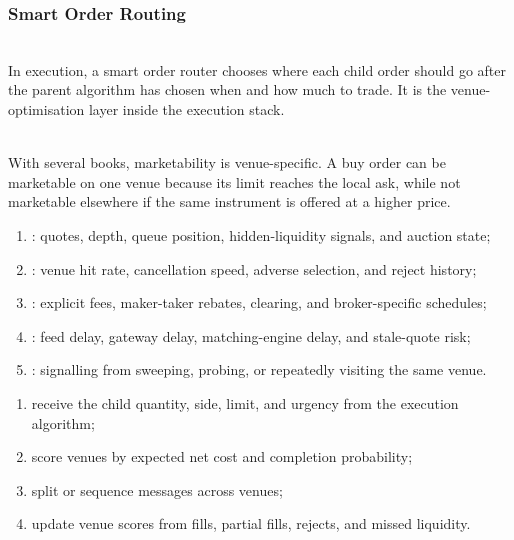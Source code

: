 \subsubsection{Smart Order Routing}

\begin{definition} \\
In execution, a smart order router chooses where each child order should go after the parent algorithm has chosen when and how much to trade. It is the venue-optimisation layer inside the execution stack.
\end{definition}

\begin{definition} \\
With several books, marketability is venue-specific. A buy order can be marketable on one venue because its limit reaches the local ask, while not marketable elsewhere if the same instrument is offered at a higher price.
\end{definition}

\begin{taxonomy} 
\begin{enumerate}[label=\roman*.]
\setlength{\itemsep}{0pt}
\item {}: quotes, depth, queue position, hidden-liquidity signals, and auction state;
\item {}: venue hit rate, cancellation speed, adverse selection, and reject history;
\item {}: explicit fees, maker-taker rebates, clearing, and broker-specific schedules;
\item {}: feed delay, gateway delay, matching-engine delay, and stale-quote risk;
\item {}: signalling from sweeping, probing, or repeatedly visiting the same venue.
\end{enumerate}
\end{taxonomy}

\begin{process} 
\begin{enumerate}[label=\roman*.]
\setlength{\itemsep}{0pt}
\item receive the child quantity, side, limit, and urgency from the execution algorithm;
\item score venues by expected net cost and completion probability;
\item split or sequence messages across venues;
\item update venue scores from fills, partial fills, rejects, and missed liquidity.
\end{enumerate}
\end{process}

